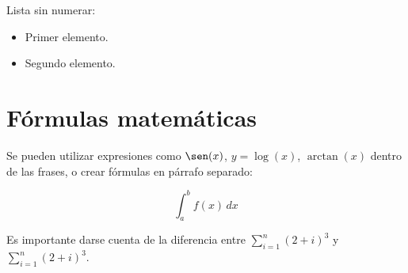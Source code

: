 Lista sin numerar:
\begin{itemize}%
	\item Primer elemento.
	\item Segundo elemento.
\end{itemize}

\section*{Fórmulas matemáticas}

Se pueden utilizar expresiones como $\sen(x)$, $y=\log(x)$, $\arctan(x)$ dentro de las frases, o crear fórmulas en párrafo separado:

\[
\int_{a}^{b} f(x) \, dx
\]

Es importante darse cuenta de la diferencia entre $\sum_{i=1}^{n} (2+i)^3$ y $\displaystyle  \sum_{i=1}^{n} (2+i)^3$.

